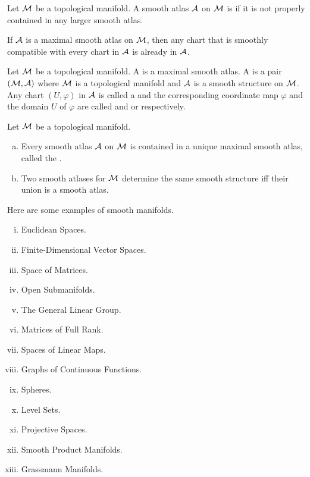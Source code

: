 \documentclass[11pt,a4paper]{article}
\begin{document}
\begin{definition}
Let $\mathcal{M}$ be a topological manifold. A smooth atlas $\mathcal{A}$ on $\mathcal{M}$ is  if it is not properly contained in any larger smooth atlas.
\end{definition}

\begin{remark}
If $\mathcal{A}$ is a maximal smooth atlas on $\mathcal{M}$, then any chart that is smoothly compatible with every chart in $\mathcal{A}$ is already in $\mathcal{A}$.
\end{remark}

\begin{definition}
Let $\mathcal{M}$ be a topological manifold. A  is a maximal smooth atlas. A  is a pair $(\mathcal{M},\mathcal{A})$ where $\mathcal{M}$ is a topological manifold and $\mathcal{A}$ is a smooth structure on $\mathcal{M}$. Any chart $(U,\varphi)$ in $\mathcal{A}$ is called a  and the corresponding coordinate map $\varphi$ and the domain $U$ of $\varphi$ are called  and  or  respectively.
\end{definition}

\begin{theorem}
Let $\mathcal{M}$ be a topological manifold.
\begin{enumerate}[(a)]
    \item Every smooth atlas $\mathcal{A}$ on $\mathcal{M}$ is contained in a unique maximal smooth atlas, called the .
    \item Two smooth atlases for $\mathcal{M}$ determine the same smooth structure iff their union is a smooth atlas.
\end{enumerate}
\end{theorem}

\begin{example}
Here are some examples of smooth manifolds.
\begin{enumerate}[(i)]
    \item Euclidean Spaces.
    \item Finite-Dimensional Vector Spaces.
    \item Space of Matrices.
    \item Open Submanifolds.
    \item The General Linear Group.
    \item Matrices of Full Rank.
    \item Spaces of Linear Maps.
    \item Graphs of Continuous Functions.
    \item Spheres.
    \item Level Sets.
    \item Projective Spaces.
    \item Smooth Product Manifolds.
    \item Grassmann Manifolds.
\end{enumerate}
\end{example}
\end{document}
